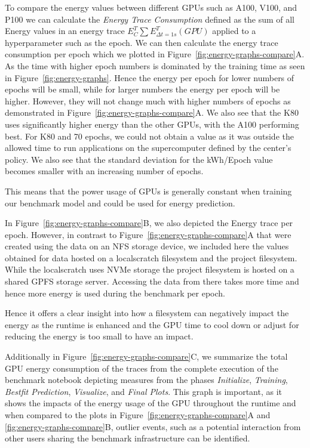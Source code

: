 \documentclass[utf8]{FrontiersinVancouver} %
\newcommand{\TODO}[2]{\todo[inline]{{\bf \color{red} #1} #2}}
\begin{document}

To compare the energy values between different GPUs such as A100, V100, and P100 we can calculate the {\em Energy Trace Consumption} defined as the sum of all Energy values in an energy trace $E^T_C \sum E^T_{\Delta t=1s}(GPU)$ applied to a hyperparameter such as the epoch.  We can then calculate the energy trace consumption per epoch which we plotted in Figure~\ref{fig:energy-graphs-compare}A.  As the time with higher epoch numbers is dominated by the training time as seen in Figure~\ref{fig:energy-graphs}.  Hence the energy per epoch for lower numbers of epochs will be small, while for larger numbers the energy per epoch will be higher. However, they will not change much with higher numbers of epochs as demonstrated in Figure~\ref{fig:energy-graphs-compare}A.  We also see that the K80 uses significantly higher energy than the other GPUs, with the A100 performing best. For K80 and 70 epochs, we could not obtain a value as it was outside the allowed time to run applications on the supercomputer defined by the center's policy.  We also see that the standard deviation for the kWh/Epoch value becomes smaller with an increasing number of epochs.

This means that the power usage of GPUs is generally constant when training our benchmark model and could be used for energy prediction.



In Figure~\ref{fig:energy-graphs-compare}B, we also depicted the Energy trace per epoch. However, in contrast to Figure~\ref{fig:energy-graphs-compare}A that were created using the data on an NFS storage device, we included here the values obtained for data hosted on a localscratch filesystem and the project filesystem. While the localscratch uses NVMe storage the project filesystem is hosted on a shared GPFS storage server. Accessing the data from there takes more time and hence more energy is used during the benchmark per epoch.

Hence it offers a clear insight into how a filesystem can negatively impact the energy as the runtime is enhanced and the GPU time to cool down or adjust for reducing the energy is too small to have an impact.


Additionally in Figure~\ref{fig:energy-graphs-compare}C, we summarize the total GPU energy consumption of the traces from the complete execution of the benchmark notebook depicting measures from the phases {\em Initialize}, {\em Training}, {\em Bestfit Prediction}, {\em Visualize}, and {\em Final Plots}.  This graph is important, as it shows the impacts of the energy usage of the GPU throughout the runtime and when compared to the plots in Figure~\ref{fig:energy-graphs-compare}A and \ref{fig:energy-graphs-compare}B, outlier events, such as a potential interaction from other users sharing the benchmark infrastructure can be identified.
\end{document}
